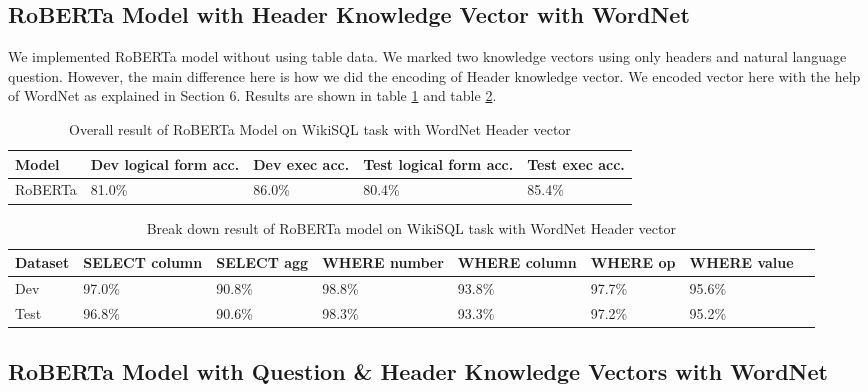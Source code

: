 \documentclass[12pt]{article}
\begin{document}
\subsection{RoBERTa Model with Header Knowledge Vector with WordNet}

We implemented RoBERTa model without using table data. We marked two knowledge vectors using only headers and natural language question. However, the main difference here is how we did the  encoding of Header knowledge vector. We encoded vector here with the help of WordNet as explained in Section 6. Results are shown in table \ref{robertatableoneheader} and table \ref{robertatabledetailedoneheader}.



 \begin{table}
\centering
 \begin{tabular}{| m{2cm} | m{2cm}| m{2cm} |m{2cm}| m{2cm} |} 
 \hline
Model & Dev logical form acc. & Dev exec acc. & Test logical form acc. & Test exec acc. \\ 
 \hline\hline
  RoBERTa & 81.0\% & 86.0\% & 80.4\% & 85.4\% \\ 
 \hline
\end{tabular}
\caption{Overall result of RoBERTa Model on WikiSQL task with WordNet Header vector}
\label{robertatableoneheader}
\end{table}


\begin{table}
\centering
 \begin{tabular}{| m{2cm} | m{2cm}| m{2cm} |m{2cm}| m{2cm} |m{2cm} | m{2cm} |m{2cm} |} 
 \hline
  Dataset & SELECT column & SELECT agg & WHERE number & WHERE column & WHERE op & WHERE value\\ 
 \hline\hline
  Dev & 97.0\% & 90.8\% & 98.8\% & 93.8\% & 97.7\% &  95.6\% \\ 
\hline
 Test & 96.8\% & 90.6\% & 98.3\% & 93.3\% & 97.2\% &  95.2\% \\ 
 \hline

\end{tabular}
\caption{Break down result of RoBERTa model on WikiSQL task with WordNet Header vector}
\label{robertatabledetailedoneheader}
\end{table}


\subsection{RoBERTa Model with Question \& Header Knowledge Vectors with WordNet}
\end{document}
